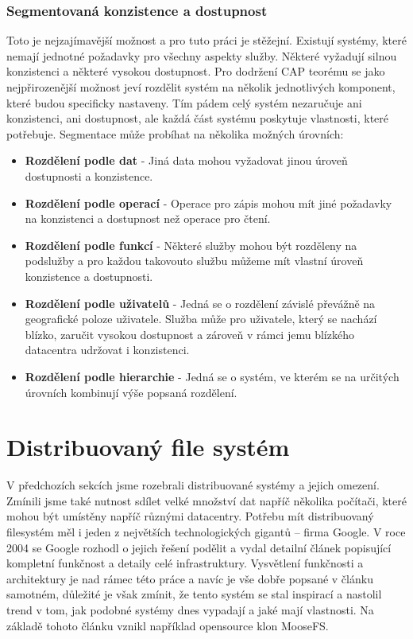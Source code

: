 \subsubsection{Segmentovaná konzistence a dostupnost}
Toto je nejzajímavější možnost a pro tuto práci je stěžejní. Existují systémy, které nemají jednotné požadavky pro všechny aspekty služby. Některé vyžadují silnou konzistenci a některé vysokou dostupnost. Pro dodržení CAP teorému se jako nejpřirozenější možnost jeví rozdělit systém na několik jednotlivých komponent, které budou specificky nastaveny. Tím pádem celý systém nezaručuje ani konzistenci, ani dostupnost, ale každá část systému poskytuje vlastnosti, které potřebuje. Segmentace může probíhat na několika možných úrovních: 

\begin{itemize}
\item \textbf{Rozdělení podle dat} - Jiná data mohou vyžadovat jinou úroveň dostupnosti a konzistence.
\item \textbf{Rozdělení podle operací} - Operace pro zápis mohou mít jiné požadavky na konzistenci a dostupnost než operace pro čtení.
\item \textbf{Rozdělení podle funkcí} - Některé služby mohou být rozděleny na podslužby a pro každou takovouto službu můžeme mít vlastní úroveň konzistence a dostupnosti. 
\item \textbf{Rozdělení podle uživatelů} - Jedná se o rozdělení závislé převážně na geografické poloze uživatele. Služba může pro uživatele, který se nachází blízko, zaručit vysokou dostupnost a zároveň v rámci jemu blízkého datacentra udržovat i konzistenci. 
\item \textbf{Rozdělení podle hierarchie} - Jedná se o systém, ve kterém se na určitých úrovních kombinují výše popsaná rozdělení.
 
\end{itemize}
\section{Distribuovaný file systém}

V předchozích sekcích jsme rozebrali distribuované systémy a jejich omezení. Zmínili jsme také nutnost sdílet velké množství dat napříč několika počítači, které mohou být umístěny napříč různými datacentry. Potřebu mít distribuovaný filesystém měl i jeden z největších technologických gigantů – firma Google. V roce 2004 se Google rozhodl o jejich řešení podělit a vydal detailní článek \cite{gfs} popisující kompletní funkčnost a detaily celé infrastruktury. Vysvětlení funkčnosti a architektury je nad rámec této práce a navíc je vše dobře popsané v článku samotném, důležité je však zmínit, že tento systém se stal inspirací a nastolil trend v tom, jak podobné systémy dnes vypadají a jaké mají vlastnosti. Na základě tohoto článku vznikl například opensource klon MooseFS.


